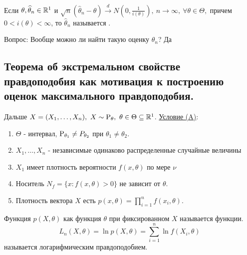 \begin{definition}
    Если \(\theta, \widehat{\theta}_n \in \R^1\) и $\sqrt{n}(\widehat{\theta}_n - \theta)\xrightarrow{d} N(0, \frac{1}{i(\theta)}),
    \ n \rightarrow \infty, \ \forall \theta \in \Theta,$
    причем \(0 < i(\theta) < \infty\), то \(\widehat{\theta}_n\) называется .
\end{definition}
Вопрос: Вообще можно ли найти такую оценку \(\widehat{\theta}_n\)? Да

\subsection{Теорема об экстремальном свойстве правдоподобия как мотивация
к построению оценок максимального правдоподобия.}

Дальше \(X = (X_1, \ldots, X_n), \ X \sim \P_\theta,\ \theta \in \Theta \subseteq \R^1\).
\underline{Условие (A)}:
\begin{enumerate}
    \item \(\Theta\) - интервал, \(\P_{\theta_1} \neq P_{\theta_2}\) при \(\theta_1 \neq \theta_2\).
    \item \(X_1, \ldots, X_n\) - независимые одинаково распределенные случайные величины
    \item \(X_1\) имеет плотность вероятности \(f(x, \theta)\) по мере \(\nu\)
    \item Носитель \(N_f = \{x: f(x, \theta) > 0\}\) не зависит от \(\theta\).
    \item Плотность вектора \(X\) есть \(p(x, \theta) = \prod_{i=1}^n f(x_i, \theta)\).
\end{enumerate}
\begin{definition}
    Функция \(p(X, \theta)\) как функция \(\theta\) при фиксированном \(X\) называется
     функции.
    \[L_n(X, \theta) = \ln p(X, \theta) = \sum_{i=1}^n \ln f(X_i, \theta)\]
    называется логарифмическим правдоподобием.
\end{definition}


